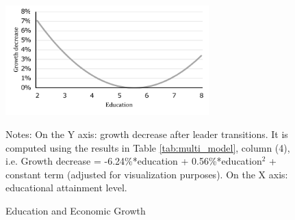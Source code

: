 \begin{figure}
	\centering
	\includegraphics[width = 0.7\textwidth]{Figures/growth_variation.pdf}
	\caption{Education and Economic Growth}
	\label{fig:educ_growth}
	\medskip %
	\begin{minipage}{\textwidth} %
		{\footnotesize  Notes: On the Y axis: growth decrease after leader transitions. It is computed using the results in Table \ref{tab:multi_model}, column (4), i.e. Growth decrease = -6.24\%*education + 0.56\%*education$^2$ + constant term (adjusted for visualization purposes). On the X axis: educational attainment level. \par}
	\end{minipage}
\end{figure}